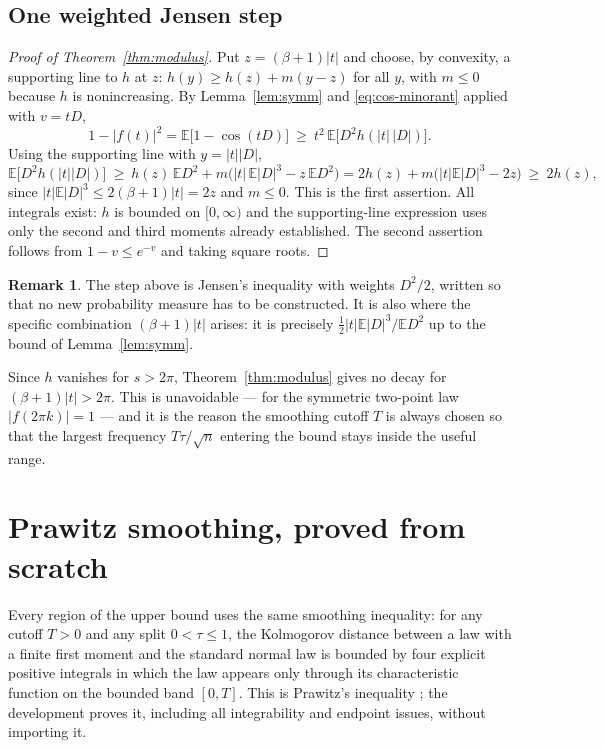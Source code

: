 \documentclass[10pt,a4paper]{article}
\theoremstyle{plain}
\theoremstyle{definition}
\newtheorem{remark}[theorem]{Remark}
\newcommand{\E}{\mathbb{E}}
\begin{document}
\subsection{One weighted Jensen step}

\begin{proof}[Proof of Theorem~\ref{thm:modulus}]
Put $z=(\beta+1)|t|$ and choose, by convexity, a supporting line to $h$ at
$z$: $h(y)\ge h(z)+m(y-z)$ for all $y$, with $m\le0$ because $h$ is
nonincreasing. By Lemma~\ref{lem:symm} and \eqref{eq:cos-minorant} applied with
$v=tD$,
\[
  1-|f(t)|^2 = \E\bigl[1-\cos(tD)\bigr]
  \ \ge\ t^2\,\E\bigl[D^2h(|t|\,|D|)\bigr] .
\]
Using the supporting line with $y=|t||D|$,
\[
  \E\bigl[D^2h(|t||D|)\bigr]
  \ \ge\ h(z)\,\E D^2 + m\bigl(|t|\,\E|D|^3 - z\,\E D^2\bigr)
  = 2h(z) + m\bigl(|t|\E|D|^3-2z\bigr) \ \ge\ 2h(z),
\]
since $|t|\E|D|^3\le 2(\beta+1)|t|=2z$ and $m\le0$. This is the first
assertion. All integrals exist: $h$ is bounded on $[0,\infty)$ and the
supporting-line expression uses only the second and third moments already
established. The second assertion follows from $1-v\le e^{-v}$ and taking
square roots.
\end{proof}

\begin{remark}
The step above is Jensen's inequality with weights $D^2/2$, written so that no
new probability measure has to be constructed. It is also where the specific
combination $(\beta+1)|t|$ arises: it is precisely $\tfrac12|t|\E|D|^3/\E D^2$
up to the bound of Lemma~\ref{lem:symm}.
\end{remark}

Since $h$ vanishes for $s>2\pi$, Theorem~\ref{thm:modulus} gives no decay for
$(\beta+1)|t|>2\pi$. This is unavoidable --- for the symmetric two-point law
$|f(2\pi k)|=1$ --- and it is the reason the smoothing cutoff $T$ is always
chosen so that the largest frequency $T\tau/\sqrt n$ entering the bound stays
inside the useful range.

\section{Prawitz smoothing, proved from scratch}
\label{sec:prawitz}

Every region of the upper bound uses the same smoothing inequality: for any
cutoff $T>0$ and any split $0<\tau\le1$, the Kolmogorov distance between a law
with a finite first moment and the standard normal law is bounded by four
explicit positive integrals in which the law appears only through its
characteristic function on the bounded band $[0,T]$. This is Prawitz's
inequality \cite{Prawitz1972}; the development proves it, including all
integrability and endpoint issues, without importing it.
\end{document}
